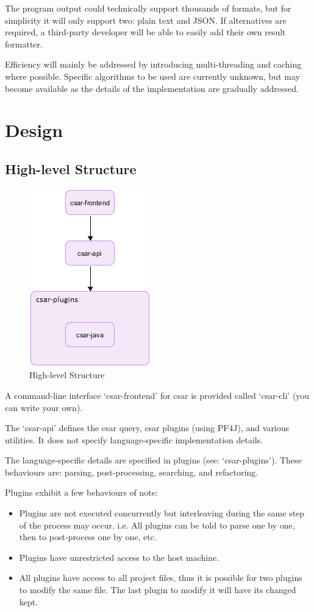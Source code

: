 \documentclass[12pt, letterpaper]{article}
\begin{document}
The program output could technically support thousands of formats, but for simplicity it will only support two: plain text and JSON.
If alternatives are required, a third-party developer will be able to easily add their own result formatter.

Efficiency will mainly be addressed by introducing multi-threading and caching where possible.
Specific algorithms to be used are currently unknown, but may become available as the details of the implementation are gradually addressed.

\section{Design}
\subsection{High-level Structure}

\begin{figure}[!hb]
  \centering
  \caption{High-level Structure}
  \includegraphics{figure-1}
\end{figure}

A command-line interface `csar-frontend' for csar is provided called `csar-cli' (you can write your own).

The `csar-api' defines the csar query, csar plugins (using PF4J), and various utilities.
It does not specify language-specific implementation details.

The language-specific details are specified in plugins (see: `csar-plugins'). These behaviours are: parsing, post-processing, searching, and refactoring.

Plugins exhibit a few behaviours of note:
\begin{itemize}
  \item Plugins are not executed concurrently but interleaving during the same step of the process may occur.
  i.e. All plugins can be told to parse one by one, then to post-process one by one, etc.
  \item Plugins have unrestricted access to the host machine.
  \item All plugins have access to all project files, thus it is possible for two plugins to modify the same file.
  The last plugin to modify it will have its changed kept.
\end{itemize}
\end{document}
